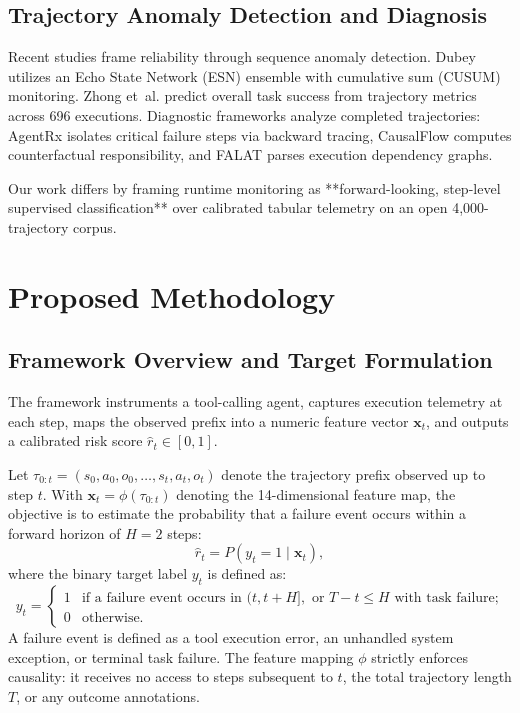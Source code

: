 \documentclass[journal,compsoc]{IEEEtran}
\begin{document}
\subsection{Trajectory Anomaly Detection and Diagnosis}
Recent studies frame reliability through sequence anomaly detection. Dubey \cite{dubey2026realtime} utilizes an Echo State Network (ESN) ensemble with cumulative sum (CUSUM) monitoring. Zhong et~al. \cite{zhong2026trajectory} predict overall task success from trajectory metrics across 696 executions. Diagnostic frameworks analyze completed trajectories: AgentRx \cite{barke2026agentrx} isolates critical failure steps via backward tracing, CausalFlow \cite{bonagiri2026causalflow} computes counterfactual responsibility, and FALAT \cite{rafi2026falat} parses execution dependency graphs.

Our work differs by framing runtime monitoring as **forward-looking, step-level supervised classification** over calibrated tabular telemetry on an open 4,000-trajectory corpus.

\section{Proposed Methodology}

\subsection{Framework Overview and Target Formulation}
The framework instruments a tool-calling agent, captures execution telemetry at each step, maps the observed prefix into a numeric feature vector $\mathbf{x}_t$, and outputs a calibrated risk score $\hat{r}_t \in [0, 1]$.

Let $\tau_{0:t} = (s_0, a_0, o_0, \dots, s_t, a_t, o_t)$ denote the trajectory prefix observed up to step $t$. With $\mathbf{x}_t = \phi(\tau_{0:t})$ denoting the 14-dimensional feature map, the objective is to estimate the probability that a failure event occurs within a forward horizon of $H=2$ steps:
\begin{equation}
\hat{r}_t = P(y_t = 1 \mid \mathbf{x}_t),
\end{equation}
where the binary target label $y_t$ is defined as:
\begin{equation}
y_t = \begin{cases} 
1 & \text{if a failure event occurs in } (t, t+H], \text{ or } T - t \le H \text{ with task failure;} \\ 
0 & \text{otherwise.} 
\end{cases}
\label{eq:label}
\end{equation}
A failure event is defined as a tool execution error, an unhandled system exception, or terminal task failure. The feature mapping $\phi$ strictly enforces causality: it receives no access to steps subsequent to $t$, the total trajectory length $T$, or any outcome annotations.
\end{document}
